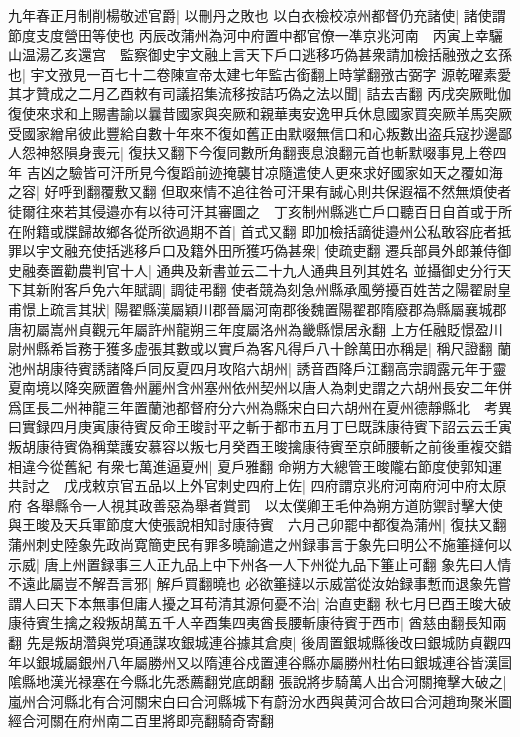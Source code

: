 九年春正月制削楊敬述官爵|{
	以刪丹之敗也}
以白衣檢校凉州都督仍充諸使|{
	諸使謂節度支度營田等使也}
丙辰改蒲州為河中府置中都官僚一凖京兆河南　丙寅上幸驪山温湯乙亥還宫　監察御史宇文融上言天下戶口逃移巧偽甚衆請加檢括融㢸之玄孫也|{
	宇文㢸見一百七十二卷陳宣帝太建七年監古銜翻上時掌翻㢸古弼字}
源乾曜素愛其才贊成之二月乙酉敕有司議招集流移按詰巧偽之法以聞|{
	詰去吉翻}
丙戌突厥毗伽復使來求和上賜書諭以曩昔國家與突厥和親華夷安逸甲兵休息國家買突厥羊馬突厥受國家繒帛彼此豐給自數十年來不復如舊正由默啜無信口和心叛數出盗兵寇抄邊鄙人怨神怒隕身喪元|{
	復扶又翻下今復同數所角翻喪息浪翻元首也斬默啜事見上卷四年}
吉凶之驗皆可汗所見今復蹈前迹掩襲甘凉隨遣使人更來求好國家如天之覆如海之容|{
	好呼到翻覆敷又翻}
但取來情不追往咎可汗果有誠心則共保遐福不然無煩使者徒爾往來若其侵邉亦有以待可汗其審圖之　丁亥制州縣逃亡戶口聽百日自首或于所在附籍或牒歸故鄉各從所欲過期不首|{
	首式又翻}
即加檢括謫徙邉州公私敢容庇者抵罪以宇文融充使括逃移戶口及籍外田所獲巧偽甚衆|{
	使疏吏翻}
遷兵部員外郎兼侍御史融奏置勸農判官十人|{
	通典及新書並云二十九人通典且列其姓名}
並攝御史分行天下其新附客戶免六年賦調|{
	調徒弔翻}
使者競為刻急州縣承風勞擾百姓苦之陽翟尉皇甫憬上疏言其狀|{
	陽翟縣漢屬穎川郡晉屬河南郡後魏置陽翟郡隋廢郡為縣屬襄城郡唐初屬嵩州貞觀元年屬許州龍朔三年度屬洛州為畿縣憬居永翻}
上方任融貶憬盈川尉州縣希旨務于獲多虚張其數或以實戶為客凡得戶八十餘萬田亦稱是|{
	稱尺證翻}
蘭池州胡康待賓誘諸降戶同反夏四月攻陷六胡州|{
	誘音酉降戶江翻高宗調露元年于靈夏南境以降突厥置魯州麗州含州塞州依州契州以唐人為刺史謂之六胡州長安二年併爲匡長二州神龍三年置蘭池都督府分六州為縣宋白曰六胡州在夏州德靜縣北　考異曰實録四月庚寅康待賓反命王晙討平之斬于都市五月丁巳既誅康待賓下詔云云壬寅叛胡康待賓偽稱葉護安慕容以叛七月癸酉王晙擒康待賓至京師腰斬之前後重複交錯相違今從舊紀}
有衆七萬進逼夏州|{
	夏戶雅翻}
命朔方大總管王晙隴右節度使郭知運共討之　戊戌敕京官五品以上外官刺史四府上佐|{
	四府謂京兆府河南府河中府太原府}
各舉縣令一人視其政善惡為舉者賞罰　以太僕卿王毛仲為朔方道防禦討擊大使與王晙及天兵軍節度大使張說相知討康待賓　六月己卯罷中都復為蒲州|{
	復扶又翻}
蒲州刺史陸象先政尚寛簡吏民有罪多曉諭遣之州録事言于象先曰明公不施箠撻何以示威|{
	唐上州置録事三人正九品上中下州各一人下州從九品下箠止可翻}
象先曰人情不遠此屬豈不解吾言邪|{
	解戶買翻曉也}
必欲箠撻以示威當從汝始録事慙而退象先嘗謂人曰天下本無事但庸人擾之耳苟清其源何憂不治|{
	治直吏翻}
秋七月巳酉王晙大破康待賓生擒之殺叛胡萬五千人辛酉集四夷酋長腰斬康待賓于西市|{
	酋慈由翻長知兩翻}
先是叛胡濳與党項通謀攻銀城連谷據其倉庾|{
	後周置銀城縣後改曰銀城防貞觀四年以銀城屬銀州八年屬勝州又以隋連谷戍置連谷縣亦屬勝州杜佑曰銀城連谷皆漢圁隂縣地漢光禄塞在今縣北先悉薦翻党底朗翻}
張說將步騎萬人出合河關掩擊大破之|{
	嵐州合河縣北有合河關宋白曰合河縣城下有蔚汾水西與黄河合故曰合河趙珣聚米圖經合河關在府州南二百里將即亮翻騎奇寄翻}

